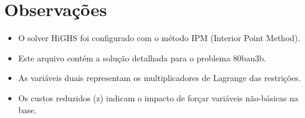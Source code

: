 \documentclass[12pt]{article}
\begin{document}
\section{Observações}

\begin{itemize}
\item O solver HiGHS foi configurado com o método IPM (Interior Point Method).
\item Este arquivo contém a solução detalhada para o problema 80bau3b.
\item As variáveis duais representam os multiplicadores de Lagrange das restrições.
\item Os custos reduzidos (z) indicam o impacto de forçar variáveis não-básicas na base.
\end{itemize}
\end{document}
